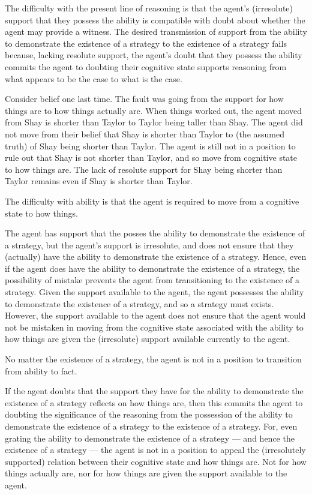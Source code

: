 \documentclass[10pt]{article}
\begin{document}
\begin{note}
  The difficulty with the present line of reasoning is that the agent's (irresolute) support that they possess the ability is compatible with doubt about whether the agent may provide a witness.
  The desired transmission of support from the ability to demonstrate the existence of a strategy to the existence of a strategy fails because, lacking resolute support, the agent's doubt that they possess the ability commits the agent to doubting their cognitive state supports reasoning from what appears to be the case to what is the case.
\end{note}

\begin{note}
  Consider belief one last time.
  The fault was going from the support for how things are to how things actually are.
  When things worked out, the agent moved from Shay is shorter than Taylor to Taylor being taller than Shay.
  The agent did not move from their belief that Shay is shorter than Taylor to (the assumed truth) of Shay being shorter than Taylor.
  The agent is still not in a position to rule out that Shay is not shorter than Taylor, and so move from cognitive state to how things are.
  The lack of resolute support for Shay being shorter than Taylor remains even if Shay is shorter than Taylor.

  The difficulty with ability is that the agent is required to move from a cognitive state to how things.

  The agent has support that the posses the ability to demonstrate the existence of a strategy, but the agent's support is irresolute, and does not ensure that they (actually) have the ability to demonstrate the existence of a strategy.
  Hence, even if the agent does have the ability to demonstrate the existence of a strategy, the possibility of mistake prevents the agent from transitioning to the existence of a strategy.
  Given the support available to the agent, the agent possesses the ability to demonstrate the existence of a strategy, and so a strategy must exists.
  However, the support available to the agent does not ensure that the agent would not be mistaken in moving from the cognitive state associated with the ability to how things are given the (irresolute) support available currently to the agent.

  No matter the existence of a strategy, the agent is not in a position to transition from ability to fact.

  If the agent doubts that the support they have for the ability to demonstrate the existence of a strategy reflects on how things are, then this commits the agent to doubting the significance of the reasoning from the possession of the ability to demonstrate the existence of a strategy to the existence of a strategy.
  For, even grating the ability to demonstrate the existence of a strategy --- and hence the existence of a strategy --- the agent is not in a position to appeal the (irresolutely supported) relation between their cognitive state and how things are.
  Not for how things actually are, nor for how things are given the support available to the agent.
\end{note}
\end{document}
